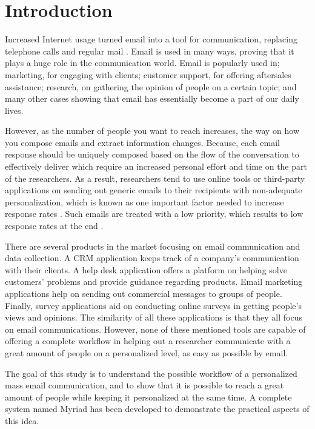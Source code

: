 \chapter{Introduction}
\label{chp:Intro}
Increased Internet usage turned email into a tool for communication, replacing telephone calls and regular mail \citep{Norman2000,Madden2003}. Email is used in many ways, proving that it plays a huge role in the communication world. Email is popularly used in; marketing, for engaging with clients; customer support, for offering aftersales assistance; research, on gathering the opinion of people on a certain topic; and many other cases showing that email has essentially become a part of our daily lives.
\vspace{1cm}

However, as the number of people you want to reach increases, the way on how you compose emails and extract information changes. Because, each email response should be uniquely composed based on the flow of the conversation to effectively deliver which require an increased personal effort and time on the part of the researchers. As a result, researchers tend to use online tools or third-party applications on sending out generic emails to their recipients with non-adequate personalization, which is known as one important factor needed to increase response rates \citep{Dillman1991,Schaefer1998}. Such emails are treated with a low priority, which results to low response rates at the end \citep[page 272]{DillmanDonA.SmythJoleneD.Christian2009}.
\vspace{1cm}

There are several products in the market focusing on email communication and data collection. A \ac{CRM} application keeps track of a company's communication with their clients. A help desk application offers a platform on helping solve customers' problems and provide guidance regarding products. Email marketing applications help on sending out commercial messages to groups of people. Finally, survey applications aid on conducting online surveys in getting people's views and opinions. The similarity of all these applications is that they all focus on email communications. However, none of these mentioned tools are capable of offering a complete workflow in helping out a researcher communicate with a great amount of people on a personalized level, as easy as possible by email.
\vspace{1cm}

The goal of this study is to understand the possible workflow of a personalized mass email communication, and to show that it is possible to reach a great amount of people while keeping it personalized at the same time. A complete system named Myriad has been developed to demonstrate the practical aspects of this idea.

